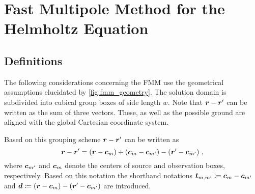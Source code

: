 \section{Fast Multipole Method for the Helmholtz Equation}

\subsection{Definitions}

The following considerations concerning the \ac{FMM} use the geometrical
assumptions elucidated by \cref{fig:fmm_geometry}. The solution domain is
subdivided into cubical group boxes of side length $w$.
Note that $\rdiff$ can be written as the sum of three vectors. These, as well
as the possible ground are aligned with the global Cartesian coordinate system.

Based on this grouping scheme $\rdiff$ can be written as
\begin{equation}
	\rdiff =
	\left( \robs - \fmmObsGroupCenter              \right) +
	\left( \fmmObsGroupCenter - \fmmSrcGroupCenter \right) -
	\left( \rsrc - \fmmSrcGroupCenter              \right) \, ,
\end{equation}
where $\fmmSrcGroupCenter$ and $\fmmObsGroupCenter$ denote the centers of
source and observation boxes, respectively.
Based on this notation the shorthand notations 
$\fmmDiffGroupCenters \coloneqq \fmmObsGroupCenter - \fmmSrcGroupCenter$
and 
$\pvec{d} \coloneqq \left( \robs - \fmmObsGroupCenter \right) - \left( \rsrc - \fmmSrcGroupCenter \right)$
are introduced.

